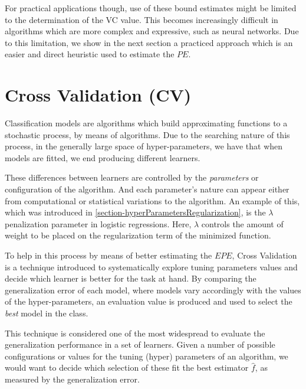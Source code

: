 For practical applications though, use of these bound estimates might be limited to the determination of the VC value. This becomes increasingly difficult in algorithms which are more complex and expressive, such as neural networks.
Due to this limitation, we show in the next section a practiced approach which is an easier and direct heuristic used to estimate the $PE$.



\section{Cross Validation (CV)}\label{section:crossValidation}

Classification models are algorithms which build approximating functions to a stochastic process, by means of algorithms. Due to the searching nature of this process, in the generally large space of hyper-parameters, we have that when models are fitted, we end producing different learners.

These differences between learners are controlled by the \textit{parameters} or configuration of the algorithm.
And each parameter's nature can appear either from computational or statistical variations to the algorithm.
An example of this, which was introduced in \cref{section-hyperParametersRegularization}, is the $\lambda$ penalization parameter in logistic regressions.
Here, $\lambda$ controls the amount of weight to be placed on the regularization term of the minimized function.

To help in this process by means of better estimating the $EPE$, Cross Validation is a technique introduced to systematically explore tuning parameters values and decide which learner is better for the task at hand.
By comparing the generalization error of each model, where models vary accordingly with the values of the hyper-parameters, an evaluation value is produced and used to select the \textit{best} model in the class.

This technique is considered one of the most widespread to evaluate the generalization performance in a set of learners.
Given a number of possible configurations or values for the tuning (hyper) parameters of an algorithm, we would want to decide which selection of these fit the best estimator $\hat{f}$, as measured by the generalization error.

%

